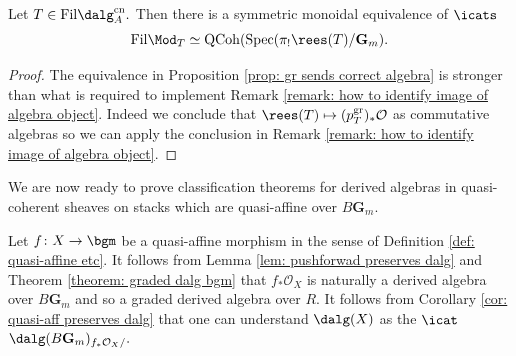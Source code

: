 \documentclass[10pt,reqno]{amsart}
\numberwithin{equation}{section}
\newcommand{\cO}{{\mathcal{O}}}
\newcommand{\G}{\mathbf{G}}
\newcommand{\spec}{{\mathrm{Spec}}}
\newcommand{\Qcoh}{\mathrm{QCoh}}
\newcommand{\fil}{\mathrm{Fil}}
\newcommand{\gr}{\mathrm{gr}}
\newcommand{\cn}{\mathrm{cn}}
\begin{document}
\begin{corollary}\label{cor: simpson for filtered algebras}
Let $T\in \fil\dalg_{A}^\cn.$ Then there is a symmetric monoidal equivalence of $\icats$
$$\fil\Mod_T\simeq  \Qcoh(\spec(\pi_!\rees (T)/\G_m).$$
\end{corollary}

\begin{proof}
    The equivalence in Proposition \ref{prop: gr sends correct algebra} is stronger than what is required to implement Remark \ref{remark: how to identify image of algebra object}. Indeed we conclude that $\rees(T)\mapsto (p_T^\gr)_*\cO$ as commutative algebras so we can apply the conclusion in Remark \ref{remark: how to identify image of algebra object}. 
\end{proof}
We are now ready to prove classification theorems for derived algebras in quasi-coherent sheaves on stacks which are quasi-affine over $B\G_m$.

\begin{remark}
Let $f\colon X\to \bgm$ be a quasi-affine morphism in the sense of Definition \ref{def: quasi-affine etc}.
It follows from Lemma \ref{lem: pushforwad preserves dalg} and Theorem \ref{theorem: graded dalg bgm} that $f_*\cO_X$ is naturally a derived algebra over $B\G_m$ and so a graded derived algebra over $R$. It follows from Corollary \ref{cor: quasi-aff preserves dalg} that one can understand $\dalg(X)$ as the $\icat$ $\dalg(B\G_m)_{f_*\cO_X/}.$    
\end{remark}
\end{document}
